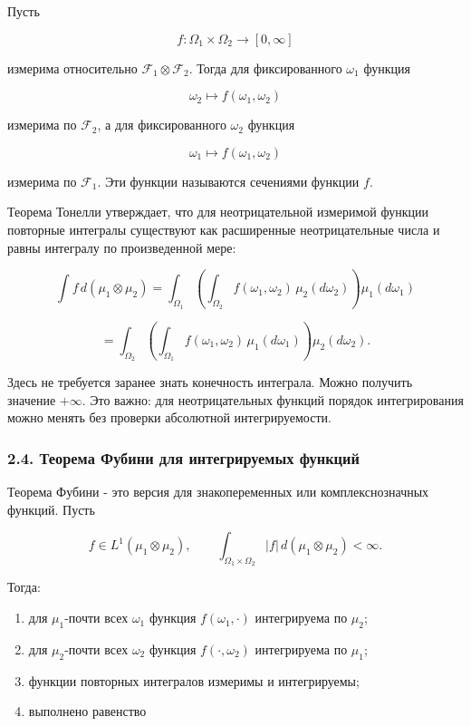 \documentclass[
  11pt,
  a4paper,
]{article}
\providecommand{\tightlist}{%
  \setlength{\itemsep}{0pt}\setlength{\parskip}{0pt}}
\begin{document}
Пусть

\[
f:\Omega_1\times\Omega_2\to[0,\infty]
\]

измерима относительно \(\mathcal F_1\otimes\mathcal F_2\). Тогда для
фиксированного \(\omega_1\) функция

\[
\omega_2\mapsto f(\omega_1,\omega_2)
\]

измерима по \(\mathcal F_2\), а для фиксированного \(\omega_2\) функция

\[
\omega_1\mapsto f(\omega_1,\omega_2)
\]

измерима по \(\mathcal F_1\). Эти функции называются сечениями функции
\(f\).

Теорема Тонелли утверждает, что для неотрицательной измеримой функции
повторные интегралы существуют как расширенные неотрицательные числа и
равны интегралу по произведенной мере:

\[
\int f\,d(\mu_1\otimes\mu_2)
=
\int_{\Omega_1}
\left(\int_{\Omega_2} f(\omega_1,\omega_2)\,\mu_2(d\omega_2)\right)
\mu_1(d\omega_1)
\]

\[
=
\int_{\Omega_2}
\left(\int_{\Omega_1} f(\omega_1,\omega_2)\,\mu_1(d\omega_1)\right)
\mu_2(d\omega_2).
\]

Здесь не требуется заранее знать конечность интеграла. Можно получить
значение \(+\infty\). Это важно: для неотрицательных функций порядок
интегрирования можно менять без проверки абсолютной интегрируемости.

\subsubsection{2.4. Теорема Фубини для интегрируемых
функций}\label{ux442ux435ux43eux440ux435ux43cux430-ux444ux443ux431ux438ux43dux438-ux434ux43bux44f-ux438ux43dux442ux435ux433ux440ux438ux440ux443ux435ux43cux44bux445-ux444ux443ux43dux43aux446ux438ux439}

Теорема Фубини - это версия для знакопеременных или комплекснозначных
функций. Пусть

\[
f\in L^1(\mu_1\otimes\mu_2),
\qquad
\int_{\Omega_1\times\Omega_2}|f|\,d(\mu_1\otimes\mu_2)<\infty.
\]

Тогда:

\begin{enumerate}
\def\labelenumi{\arabic{enumi}.}
\tightlist
\item
  для \(\mu_1\)-почти всех \(\omega_1\) функция \(f(\omega_1,\cdot)\)
  интегрируема по \(\mu_2\);
\item
  для \(\mu_2\)-почти всех \(\omega_2\) функция \(f(\cdot,\omega_2)\)
  интегрируема по \(\mu_1\);
\item
  функции повторных интегралов измеримы и интегрируемы;
\item
  выполнено равенство
\end{enumerate}
\end{document}
